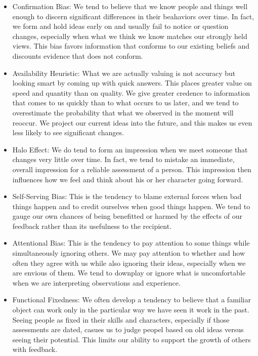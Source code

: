 \documentclass[ebook,12pt,oneside,openany]{memoir}
\begin{document}
\begin{itemize}
    \item Confirmation Bias: We tend to believe that we know people and things well enough to discern significant differences in their beahaviors over time. In fact, we form and hold ideas early on and usually fail to notice or question changes, especially when what we think we know matches our strongly held views.
    This bias favors information that conforms to our existing beliefs and discounts evidence that does not conform.
    \item Availability Heuristic: What we are actually valuing is not accuracy but looking smart by coming up with quick answers. This places greater value on speed and quantity than on quality. We give greater credence to information that comes to us quickly than to what occurs to us later, and we tend to overestimate the probability that what we observed in the moment will reoccur.
    We project our current ideas into the future, and this makes us even less likely to see significant changes.
    \item Halo Effect: We do tend to form an impression when we meet someone that changes very little over time. In fact, we tend to mistake an immediate, overall impression for a reliable assessment of a person.
    This impression then influences how we feel and think about his or her character going forward. 
    \item Self-Serving Bias: This is the tendency to blame external forces when bad things happen and to credit ourselves when good things happen. We tend to gauge our own chances of being benefitted or harmed by the effects of our feedback rather than its usefulness to the recipient.
    \item Attentional Bias: This is the tendency to pay attention to some things while simultaneously ignoring others. We may pay attention to whether and how often they agree with us while also ignoring their ideas, especially when we are envious of them. We tend to downplay or ignore what is uncomfortable when we are interpreting observations and experience.
    \item Functional Fixedness: We often develop a tendency to believe that a familiar object can work only in the particular way we have seen it work in the past. Seeing people as fixed in their skills and characters, especially if those assessments are dated, casues us to judge peopel based on old ideas versus seeing their potential. This limits our ability to support the growth of others with feedback.

\end{itemize}
\end{document}
